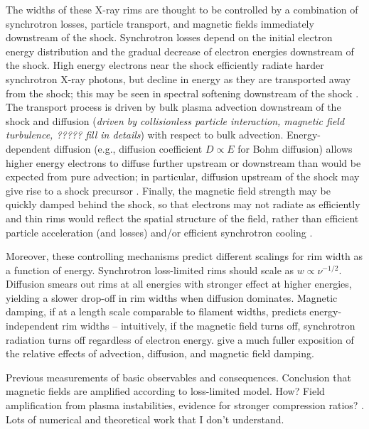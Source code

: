 \documentclass[iop, apj, numberedappendix, twocolappendix]{emulateapj}
\begin{document}
The widths of these X-ray rims are thought to be controlled by a combination of
synchrotron losses, particle transport, and magnetic fields immediately
downstream of the shock.  Synchrotron losses depend on the initial electron
energy distribution and the gradual decrease of electron energies downstream of
the shock.  High energy electrons near the shock efficiently radiate harder
synchrotron X-ray photons, but decline in energy as they are transported away
from the shock; this may be seen in spectral softening downstream of the shock
\citep[e.g.,][]{cassam-chenai2007}.  The transport process is driven by bulk
plasma advection downstream of the shock and diffusion (\emph{driven by
collisionless particle interaction, magnetic field turbulence, ?????  fill in
details}) with respect to bulk advection.  Energy-dependent diffusion (e.g.,
diffusion coefficient $D \propto E$ for Bohm diffusion) allows higher energy
electrons to diffuse further upstream or downstream than would be expected from
pure advection; in particular, diffusion upstream of the shock may give rise to
a shock precursor \citep[e.g.,][]{ghavamian2000, wagner2009, laming2014}.
Finally, the magnetic field strength may be quickly damped behind the shock, so
that electrons may not radiate as efficiently and thin rims would reflect the
spatial structure of the field, rather than efficient particle acceleration
(and losses) and/or efficient synchrotron cooling \citep{pohl2005}.

Moreover, these controlling mechanisms predict different scalings for rim width
as a function of energy.  Synchrotron loss-limited rims should scale as $w
\propto \nu^{-1/2}$.  Diffusion smears out rims at all energies with stronger
effect at higher energies, yielding a slower drop-off in rim widths when
diffusion dominates.  Magnetic damping, if at a length scale comparable to
filament widths, predicts energy-independent rim widths -- intuitively, if the
magnetic field turns off, synchrotron radiation turns off regardless of
electron energy.  \citet{ressler2014} give a much fuller exposition of the
relative effects of advection, diffusion, and magnetic field damping.

Previous measurements of basic observables \citep[e.g.,][]{bamba2003,
bamba2005-hist, bamba2005-vela, parizot2006} and consequences.  Conclusion that
magnetic fields are amplified according to loss-limited model.  How?  Field
amplification from plasma instabilities, evidence for stronger compression ratios?
\citep{blondin2001}.  Lots of numerical and theoretical work that I don't
understand.
\end{document}
